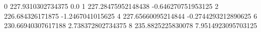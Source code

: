 0 227.9310302734375 0.0
1 227.28475952148438 -0.646270751953125
2 226.684326171875 -1.2467041015625
4 227.65660095214844 -0.2744293212890625
6 230.66940307617188 2.738372802734375
8 235.8825225830078 7.9514923095703125
